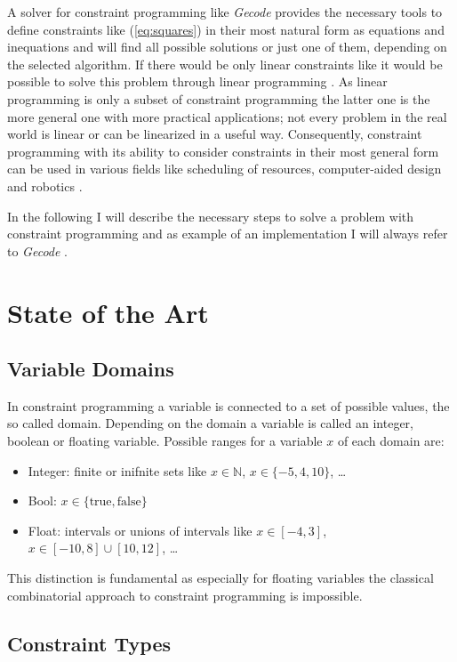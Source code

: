 \documentclass[10pt,
               a4paper,
               journal,
               ]{IEEEtran}
\newcommand{\refeq}[1]{{(\ref{#1})}}
\begin{document}
	A solver for constraint programming like \emph{Gecode} provides the necessary tools to define constraints like \refeq{eq:squares} in their most natural form as equations and inequations and will find all possible solutions or just one of them, depending on the selected algorithm. If there would be only linear constraints like it would be possible to solve this problem through linear programming \cite[1]{linearProgramming}. As linear programming is only a subset of constraint programming the latter one is the more general one with more practical applications; not every problem in the real world is linear or can be linearized in a useful way. Consequently, constraint programming with its ability to consider constraints in their most general form can be used in various fields like scheduling of resources, computer-aided design and robotics \cite[p.~221]{trendsInCP}.
	
	In the following I will describe the necessary steps to solve a problem with constraint programming and as example of an implementation I will always refer to \emph{Gecode} \cite{gecode}.
	
	\section{State of the Art}
	\subsection{Variable Domains}
	In constraint programming a variable is connected to a set of possible values, the so called domain. Depending on the domain a variable is called an integer, boolean or floating variable. Possible ranges for a variable $x$ of each domain are:
	\begin{itemize}
		\item Integer: finite or inifnite sets like $x \in \mathbb{N}$, $x \in \{-5, 4, 10\}$, \dots
		\item Bool: $x \in \{\text{true}, \text{false}\}$
		\item Float: intervals or unions of intervals like $x \in [-4, 3]$, $x \in [-10, 8] \cup [10, 12]$, \dots
	\end{itemize}
	This distinction is fundamental as especially for floating variables the classical combinatorial approach to constraint programming is impossible.
	
	\subsection{Constraint Types}
	
\end{document}
